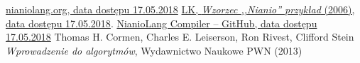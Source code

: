 \documentclass[licencjacka]{pracamgr}
\begin{document}
\appendix

\begin{thebibliography}{99}

 \href{http://www.nianiolang.org}{nianiolang.org, data dostępu 17.05.2018}
 \href{https://www.mimuw.edu.pl/~chrzaszc/BPJ20067/nianio.pdf}{LK, \textit{Wzorzec ,,Nianio'' przykład} (2006), data dostępu 17.05.2018}.
 \href{https://github.com/nianiolang/nl}{NianioLang Compiler -- GitHub,
data dostępu 17.05.2018}
 Thomas H. Cormen, Charles E. Leiserson, Ron Rivest, Clifford Stein \textit{Wprowadzenie do algorytmów}, Wydawnictwo Naukowe PWN (2013)


\end{thebibliography}
\end{document}
